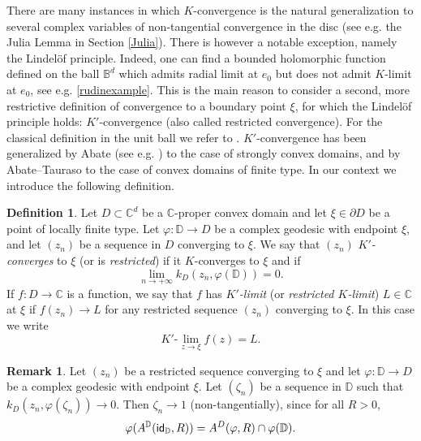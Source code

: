 \documentclass[11pt, reqno]{amsart}
\numberwithin{equation}{section}
\theoremstyle{definition}
\newtheorem{remark}[theorem]{Remark}
\newtheorem{definition}[theorem]{Definition}
\newcommand{\C}{\mathbb{C}}
\newcommand{\D}{\mathbb{D}}
\newcommand{\B}{\mathbb{B}}
\begin{document}
{		
		
		
		
		
		
		There are many instances in which $K$-convergence is the natural generalization to several complex variables of non-tangential convergence in the disc (see e.g. the Julia Lemma in Section \ref{Julia}). There is however a notable exception, namely the Lindel\"of principle. Indeed, one can find a bounded holomorphic function defined on the ball $\B^d$ which admits radial limit at $e_0$ but does not admit $K$-limit at $e_0$, see e.g. \eqref{rudinexample}.  This is the main reason to consider a second, more restrictive definition of convergence to a boundary point $\xi$, for which the Lindel\"of principle holds: $K'$-convergence (also called restricted convergence). For the classical  definition in the unit ball we refer to \cite{Rudin}. $K'$-convergence has been  generalized by Abate   (see e.g. \cite{Abatebook}) to the case of strongly convex domains, and by Abate--Tauraso \cite[Section 3]{AbTau} to the case of convex domains of finite type.
		In our context  we introduce the following definition.
		\begin{definition}\label{restricted}
			Let $D\subset\C^d$ be a $\C$-proper convex domain and let $\xi\in\partial D$ be a point of locally finite type. Let $\varphi\colon\D\to D$ be a complex geodesic  with endpoint $\xi$, and let  $(z_n)$ be a sequence in $D$ converging to $\xi$.
			We say that  $(z_n)$  {\sl $K'$-converges} to $\xi$ (or is  {\sl restricted}) if it $K$-converges to $\xi$ and if
			\begin{equation}\label{eqrestricted}
				\lim_{n\to+\infty}k_D(z_n,\varphi(\D))=0.
			\end{equation}
			If $f\colon D\to\C$ is a function, we say that  $f$ has  {\sl $K'$-limit} (or {\sl restricted $K$-limit})  $L\in\C$ at $\xi$  if $f(z_n)\to L$ for any restricted sequence $(z_n)$ converging to $\xi$. In this case we write
			$$K'\textrm{-}\lim_{z\to\xi}f(z)=L.$$
		\end{definition}
		
		\begin{remark}\label{rmkspecialnontg}
			Let $(z_n)$ be a restricted sequence converging to $\xi$ and let $\varphi\colon \D\to D$ be a complex geodesic with endpoint $\xi$.
			Let $(\zeta_n)$ be a sequence in $\D$ such that $k_D(z_n,\varphi(\zeta_n))\to 0$. Then $\zeta_n\to 1$ (non-tangentially), since for all $R>0$,
			\begin{equation}\label{geodesicintersection}
				\varphi (A^{\D}({\sf id}_{\D},R))=A^D(\varphi,R)\cap\varphi(\D).
			\end{equation}
			

\end{remark}}
\end{document}
